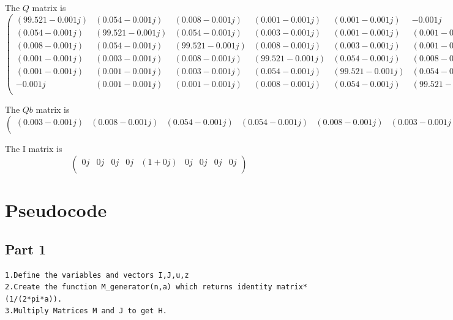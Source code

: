 \documentclass[12pt, a4paper]{report}
\begin{document}
 The $Q$ matrix is
 \footnotesize
 \begin{equation*}
    \begin{pmatrix}
(99.521-0.001j) & (0.054-0.001j) & (0.008-0.001j) & (0.001-0.001j) & (0.001-0.001j) & -0.001j\\
(0.054-0.001j) & (99.521-0.001j) & (0.054-0.001j) & (0.003-0.001j) & (0.001-0.001j) & (0.001-0.001j)\\
(0.008-0.001j) & (0.054-0.001j) & (99.521-0.001j) & (0.008-0.001j) & (0.003-0.001j) & (0.001-0.001j)\\
(0.001-0.001j) & (0.003-0.001j) & (0.008-0.001j) & (99.521-0.001j) & (0.054-0.001j) & (0.008-0.001j)\\
(0.001-0.001j) & (0.001-0.001j) & (0.003-0.001j) & (0.054-0.001j) & (99.521-0.001j) & (0.054-0.001j)\\
-0.001j & (0.001-0.001j) & (0.001-0.001j) & (0.008-0.001j) & (0.054-0.001j) & (99.521-0.001j)\\
\end{pmatrix}
\end{equation*}
\vspace{0.5cm}
  
 \normalsize
 The $Qb$ matrix is
 \footnotesize
 \begin{equation*}
   \begin{pmatrix}
(0.003-0.001j) & (0.008-0.001j) & (0.054-0.001j) & (0.054-0.001j) & (0.008-0.001j) & (0.003-0.001j)\\
\end{pmatrix}
\end{equation*}
\vspace{0.5cm}
  
  \normalsize
  The I matrix is
   \begin{equation*}
   \begin{pmatrix}
0j & 0j & 0j & 0j & (1+0j) & 0j & 0j & 0j & 0j\\
\end{pmatrix}
\end{equation*}

\section*{Pseudocode}
\subsection*{Part 1}
\begin{Verbatim}
1.Define the variables and vectors I,J,u,z
2.Create the function M_generator(n,a) which returns identity matrix*(1/(2*pi*a)). 
3.Multiply Matrices M and J to get H.
\end{Verbatim}
\end{document}
